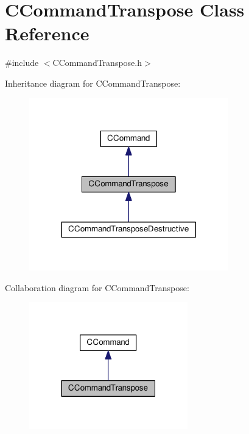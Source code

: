 \hypertarget{classCCommandTranspose}{}\section{C\+Command\+Transpose Class Reference}
\label{classCCommandTranspose}


{\ttfamily \#include $<$C\+Command\+Transpose.\+h$>$}



Inheritance diagram for C\+Command\+Transpose\+:\nopagebreak
\begin{figure}[H]
\begin{center}
\leavevmode
\includegraphics[width=245pt]{classCCommandTranspose__inherit__graph}
\end{center}
\end{figure}


Collaboration diagram for C\+Command\+Transpose\+:\nopagebreak
\begin{figure}[H]
\begin{center}
\leavevmode
\includegraphics[width=195pt]{classCCommandTranspose__coll__graph}
\end{center}
\end{figure}
